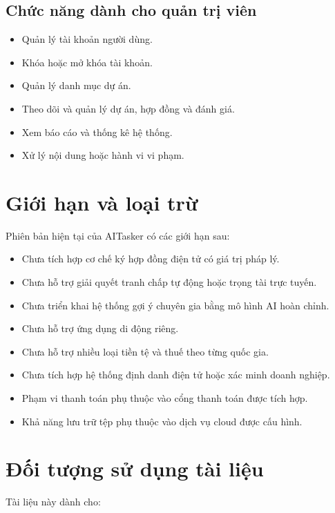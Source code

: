 \subsection{Chức năng dành cho quản trị viên}

\begin{itemize}
    \item Quản lý tài khoản người dùng.
    \item Khóa hoặc mở khóa tài khoản.
    \item Quản lý danh mục dự án.
    \item Theo dõi và quản lý dự án, hợp đồng và đánh giá.
    \item Xem báo cáo và thống kê hệ thống.
    \item Xử lý nội dung hoặc hành vi vi phạm.
\end{itemize}

\section{Giới hạn và loại trừ}
\label{sec:limitations-exclusions}

Phiên bản hiện tại của AITasker có các giới hạn sau:

\begin{itemize}
    \item Chưa tích hợp cơ chế ký hợp đồng điện tử có giá trị pháp lý.
    \item Chưa hỗ trợ giải quyết tranh chấp tự động hoặc trọng tài trực tuyến.
    \item Chưa triển khai hệ thống gợi ý chuyên gia bằng mô hình AI hoàn chỉnh.
    \item Chưa hỗ trợ ứng dụng di động riêng.
    \item Chưa hỗ trợ nhiều loại tiền tệ và thuế theo từng quốc gia.
    \item Chưa tích hợp hệ thống định danh điện tử hoặc xác minh doanh nghiệp.
    \item Phạm vi thanh toán phụ thuộc vào cổng thanh toán được tích hợp.
    \item Khả năng lưu trữ tệp phụ thuộc vào dịch vụ cloud được cấu hình.
\end{itemize}

\section{Đối tượng sử dụng tài liệu}
\label{sec:intended-audience}

Tài liệu này dành cho:

